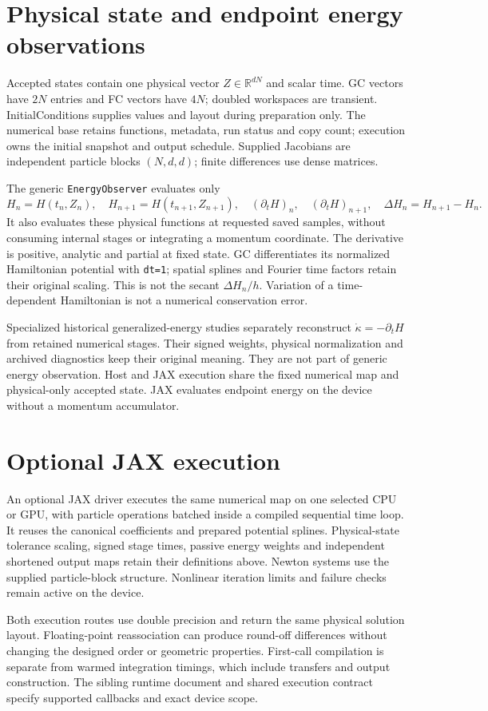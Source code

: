 \documentclass[11pt,a4paper]{article}
\begin{document}
\clearpage
\section{Physical state and endpoint energy observations}
Accepted states contain one physical vector $Z\in\mathbb{R}^{dN}$ and scalar time.
GC vectors have $2N$ entries and FC vectors have $4N$; doubled workspaces are
transient. InitialConditions supplies values and layout during preparation only.
The numerical base retains functions, metadata, run status and copy count;
execution owns the initial snapshot and output schedule. Supplied Jacobians are
independent particle blocks $(N,d,d)$; finite differences use dense matrices.

The generic \texttt{EnergyObserver} evaluates only
\[
 H_n=H(t_n,Z_n),\quad H_{n+1}=H(t_{n+1},Z_{n+1}),\quad
 (\partial_tH)_n,\quad (\partial_tH)_{n+1},\quad
 \Delta H_n=H_{n+1}-H_n.
\]
It also evaluates these physical functions at requested saved samples, without
consuming internal stages or integrating a momentum coordinate. The derivative
is positive, analytic and partial at fixed state. GC differentiates its normalized
Hamiltonian potential with \texttt{dt=1}; spatial splines and Fourier time factors
retain their original scaling. This is not the secant $\Delta H_n/h$.
Variation of a time-dependent Hamiltonian is not a numerical conservation error.

Specialized historical generalized-energy studies separately reconstruct
$\dot\kappa=-\partial_tH$ from retained numerical stages. Their signed weights,
physical normalization and archived diagnostics keep their original meaning.
They are not part of generic energy observation. Host and JAX execution share
the fixed numerical map and physical-only accepted state. JAX evaluates endpoint
energy on the device without a momentum accumulator.

\section{Optional JAX execution}

An optional JAX driver executes the same numerical map on one selected CPU
or GPU, with particle operations batched inside a compiled sequential time
loop. It reuses the canonical coefficients and prepared potential splines.
Physical-state tolerance scaling, signed stage times, passive energy weights
and independent shortened output maps retain their definitions above.
Newton systems use the supplied particle-block structure. Nonlinear
iteration limits and failure checks remain active on the device.

Both execution routes use double precision and return the same physical
solution layout. Floating-point reassociation can produce round-off
differences without changing the designed order or geometric properties.
First-call compilation is separate from warmed integration timings, which
include transfers and output construction. The sibling runtime document and
shared execution contract specify supported callbacks and exact device scope.
\end{document}
